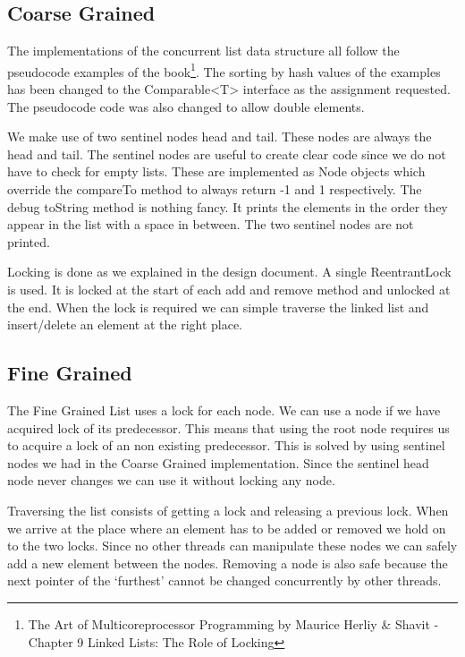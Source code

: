 \documentclass[10pt,a4paper]{article}
\begin{document}
\subsection{Coarse Grained}
The implementations of the concurrent list data structure all follow the pseudocode examples of the book\footnote{The Art of Multicoreprocessor Programming by Maurice Herliy \& Shavit - Chapter 9 Linked Lists: The Role of Locking}. The sorting by hash values of the examples has been changed to the Comparable<T> interface as the assignment requested. The pseudocode code was also changed to allow double elements.

We make use of two sentinel nodes head and tail. These nodes are always the head and tail. The sentinel nodes are useful to create clear code since we do not have to check for empty lists. These are implemented as Node objects which override the compareTo method to always return -1 and 1 respectively. The debug toString method is nothing fancy. It prints the elements in the order they appear in the list with a space in between. The two sentinel nodes are not printed.

Locking is done as we explained in the design document. A single ReentrantLock is used. It is locked at the start of each add and remove method and unlocked at the end. When the lock is required we can simple traverse the linked list and insert/delete an element at the right place. 

\subsection{Fine Grained}
The Fine Grained List uses a lock for each node. We can use a node if we have acquired lock of its predecessor. This means that using the root node requires us to acquire a lock of an non existing predecessor. This is solved by using sentinel nodes we had in the Coarse Grained implementation. Since the sentinel head node never changes we can use it without locking any node.

Traversing the list consists of getting a lock and releasing a previous lock. When we arrive at the place where an element has to be added or removed we hold on to the two locks. Since no other threads can manipulate these nodes we can safely add a new element between the nodes. Removing a node is also safe because the next pointer of the `furthest' cannot be changed concurrently by other threads.
\end{document}
